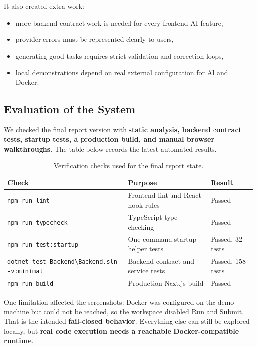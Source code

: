 \documentclass[11pt,a4paper]{article}
\begin{document}
It also created extra work:

\begin{itemize}
  \item more backend contract work is needed for every frontend AI feature,
  \item provider errors must be represented clearly to users,
  \item generating good tasks requires strict validation and correction loops,
  \item local demonstrations depend on real external configuration for AI and Docker.
\end{itemize}

\subsection{Evaluation of the System}

We checked the final report version with \textbf{static analysis, backend contract tests, startup tests, a production build, and manual browser walkthroughs}. The table below records the latest automated results.

\begin{table}[H]
\centering
\begin{tabularx}{\linewidth}{lXl}
\toprule
Check & Purpose & Result \\
\midrule
\texttt{npm run lint} & Frontend lint and React hook rules & Passed \\
\texttt{npm run typecheck} & TypeScript type checking & Passed \\
\texttt{npm run test:startup} & One-command startup helper tests & Passed, 32 tests \\
\texttt{dotnet test Backend\textbackslash Backend.sln -v:minimal} & Backend contract and service tests & Passed, 158 tests \\
\texttt{npm run build} & Production Next.js build & Passed \\
\bottomrule
\end{tabularx}
\caption{Verification checks used for the final report state.}
\end{table}

One limitation affected the screenshots: Docker was configured on the demo machine but could not be reached, so the workspace disabled Run and Submit. That is the intended \textbf{fail-closed behavior}. Everything else can still be explored locally, but \textbf{real code execution needs a reachable Docker-compatible runtime}.
\end{document}

